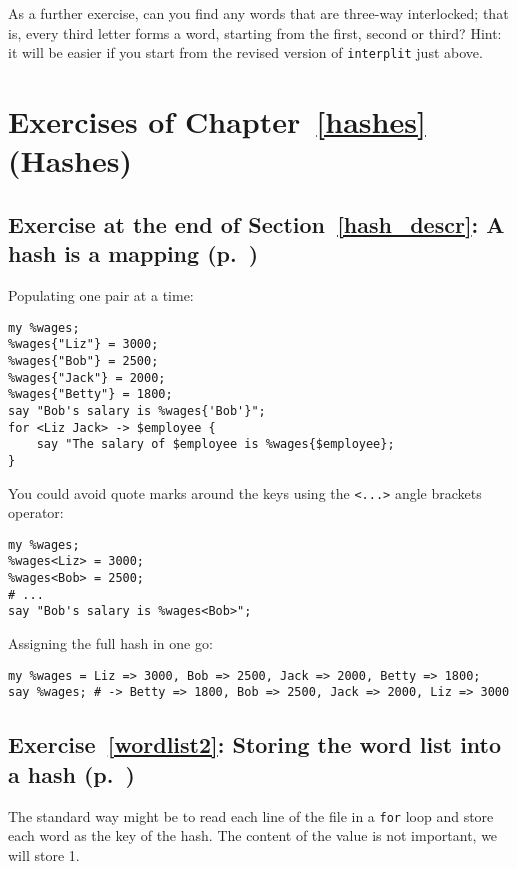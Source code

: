 {As a further exercise, can you find any words that are 
three-way interlocked; that is, every third letter forms a 
word, starting from the first, second or third? Hint: it 
will be easier if you start from the revised 
version of {\tt interplit} just above.

\section{Exercises of Chapter~\ref{hashes} (Hashes)}

\subsection{Exercise at the end of Section~\ref{hash_descr}: A hash is a mapping (p.~\pageref{ex_employees})}
\label{sol_ex_employees}

Populating one pair at a time:

\begin{verbatim}
my %wages;
%wages{"Liz"} = 3000;
%wages{"Bob"} = 2500;
%wages{"Jack"} = 2000;
%wages{"Betty"} = 1800;
say "Bob's salary is %wages{'Bob'}";
for <Liz Jack> -> $employee {
    say "The salary of $employee is %wages{$employee};
}
\end{verbatim}

You could avoid quote marks around the keys using 
the \verb'<...>' angle brackets operator:

\begin{verbatim}
my %wages;
%wages<Liz> = 3000;
%wages<Bob> = 2500;
# ...
say "Bob's salary is %wages<Bob>";
\end{verbatim}

Assigning the full hash in one go:

\begin{verbatim}
my %wages = Liz => 3000, Bob => 2500, Jack => 2000, Betty => 1800;
say %wages; # -> Betty => 1800, Bob => 2500, Jack => 2000, Liz => 3000
\end{verbatim}

\subsection{Exercise~\ref{wordlist2}: Storing the word list into a hash (p.~\pageref{wordlist2})}
\label{sol_wordlist2}

The standard way might be to read each line of the file 
in a {\tt for} loop and store each word as the key of the 
hash. The content of the value is not important, we will 
store 1.

}
